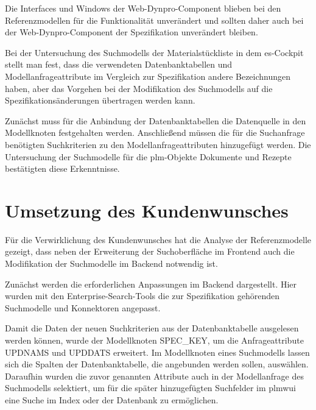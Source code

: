Die Interfaces und Windows der Web-Dynpro-Component blieben bei den Referenzmodellen für die Funktionalität unverändert und sollten daher auch bei der Web-Dynpro-Component der Spezifikation unverändert bleiben.

Bei der Untersuchung des Suchmodells der Materialstückliste in dem \ac{es}-Cockpit stellt man fest, dass die verwendeten Datenbanktabellen und Modellanfrageattribute im Vergleich zur Spezifikation andere Bezeichnungen haben, aber das Vorgehen bei der Modifikation des Suchmodells auf die Spezifikationsänderungen übertragen werden kann.

Zunächst muss für die Anbindung der Datenbanktabellen die Datenquelle in den Modellknoten festgehalten werden. Anschließend müssen die für die Suchanfrage benötigten Suchkriterien zu den Modellanfrageattributen hinzugefügt werden. Die Untersuchung der Suchmodelle für die \ac{plm}-Objekte Dokumente und Rezepte bestätigten diese Erkenntnisse.









\section{Umsetzung des Kundenwunsches}


Für die Verwirklichung des Kundenwunsches hat die Analyse der Referenzmodelle gezeigt, dass neben der Erweiterung der Suchoberfläche im Frontend auch die Modifikation der Suchmodelle im Backend notwendig ist. 


Zunächst werden die erforderlichen Anpassungen im Backend dargestellt. Hier wurden mit den Enterprise-Search-Tools die zur Spezifikation gehörenden Suchmodelle und Konnektoren angepasst.

Damit die Daten der neuen Suchkriterien aus der Datenbanktabelle ausgelesen werden können, wurde der Modellknoten SPEC\_KEY, um die Anfrageattribute UPDNAMS und UPDDATS erweitert. Im Modellknoten eines Suchmodells lassen sich die Spalten der Datenbanktabelle, die angebunden werden sollen, auswählen. Daraufhin wurden die zuvor genannten Attribute auch in der Modellanfrage des Suchmodells selektiert, um für die später hinzugefügten Suchfelder im \ac{plmwui} eine Suche im Index oder der Datenbank zu ermöglichen. 

